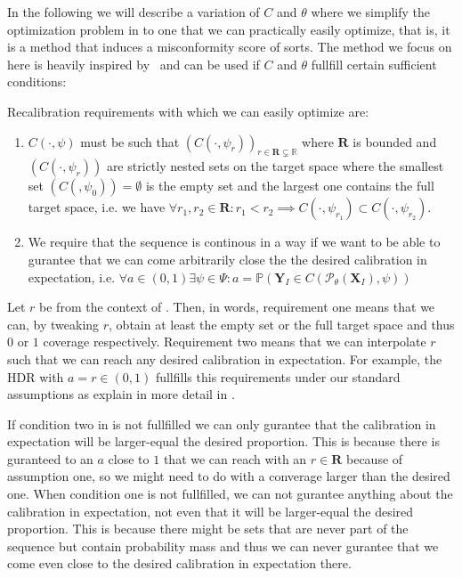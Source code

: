 In the following we will describe a variation of $C$ and $\theta$ where we simplify the optimization problem in  to one that we can practically easily optimize, that is, it is a method that induces a misconformity score of sorts. The method we focus on here is heavily inspired by~\cite{sesia2021conformal} and can be used if $C$ and $\theta$ fullfill certain sufficient conditions:

\begin{definition}\label{def:recalibration_requirements}

    Recalibration requirements with which we can easily optimize  are:
    \begin{enumerate}%
        \item $C(\cdot,\psi)$ must be such that $\left(C\left(\cdot, \psi_r\right)\right)_{r \in \mathbf{R} \subsetneq \mathbb{R}}$ where $\mathbf{R}$ is bounded and $(C(\cdot,\psi_r))$ are strictly nested sets on the target space where the smallest set $(C(,\psi_0)) = \emptyset$ is the empty set and the largest one contains the full target space, i.e. we have $\forall r_1, r_2 \in \mathbf{R}: r_1 < r_2 \implies C(\cdot,\psi_{r_1}) \subset C(\cdot, \psi_{r_2})$.
        \item We require that the sequence is continous in a way if we want to be able to gurantee that we can come arbitrarily close the the desired calibration in expectation, i.e. $\forall a\in(0,1) \exists \psi\in\Psi : a = \mathbb{P}(\mathbf{Y}_I \in C(\mathscr{P}_{\theta}(\mathbf{X}_I), \psi))$
    \end{enumerate}
\end{definition}

Let $r$ be from the context of . Then, in words, requirement one means that we can, by tweaking $r$, obtain at least the empty set or the full target space and thus $0$ or $1$ coverage respectively. Requirement two means that we can interpolate $r$ such that we can reach any desired calibration in expectation. For example, the HDR with $a = r \in (0,1)$ fullfills this requirements under our standard assumptions  as explain in more detail in .

If condition two in  is not fullfilled we can only gurantee that the calibration in expectation will be larger-equal the desired proportion. This is because there is guranteed to an $a$ close to $1$ that we can reach with an $r \in \mathbf{R}$ because of assumption one, so we might need to do with a converage larger than the desired one. When condition one is not fullfilled, we can not gurantee anything about the calibration in expectation, not even that it will be larger-equal the desired proportion. This is because there might be sets that are never part of the sequence but contain probability mass and thus we can never gurantee that we come even close to the desired calibration in expectation there.

